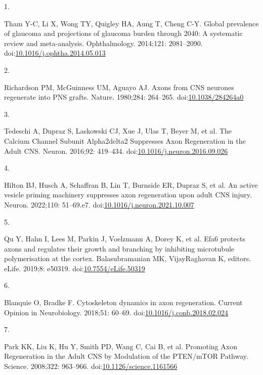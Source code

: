 \documentclass[
  12pt,
  a4paper,
]{book}
\newlength{\cslhangindent}
\newlength{\csllabelwidth}
\newlength{\cslentryspacingunit} %
\newenvironment{CSLReferences}[2] %
 {%
  \setlength{\parindent}{0pt}
  \ifodd #1
  \let\oldpar\par
  \def\par{\hangindent=\cslhangindent\oldpar}
  \fi
  \setlength{\parskip}{#2\cslentryspacingunit}
 }%
 {}
\newcommand{\CSLLeftMargin}[1]{\parbox[t]{\csllabelwidth}{#1}}
\newcommand{\CSLRightInline}[1]{\parbox[t]{\linewidth - \csllabelwidth}{#1}\break}
\begin{document}
\hypertarget{refs}{}
\begin{CSLReferences}{0}{0}
\leavevmode{}%
\CSLLeftMargin{1. }%
\CSLRightInline{Tham Y-C, Li X, Wong TY, Quigley HA, Aung T, Cheng C-Y. Global prevalence of glaucoma and projections of glaucoma burden through 2040: A systematic review and meta-analysis. Ophthalmology. 2014;121: 2081--2090. doi:\href{https://doi.org/10.1016/j.ophtha.2014.05.013}{10.1016/j.ophtha.2014.05.013}}

\leavevmode{}%
\CSLLeftMargin{2. }%
\CSLRightInline{Richardson PM, McGuinness UM, Aguayo AJ. Axons from {CNS} neurones regenerate into {PNS} grafts. Nature. 1980;284: 264--265. doi:\href{https://doi.org/10.1038/284264a0}{10.1038/284264a0}}

\leavevmode{}%
\CSLLeftMargin{3. }%
\CSLRightInline{Tedeschi A, Dupraz S, Laskowski CJ, Xue J, Ulas T, Beyer M, et al. The {Calcium Channel Subunit Alpha2delta2 Suppresses Axon Regeneration} in the {Adult CNS}. Neuron. 2016;92: 419--434. doi:\href{https://doi.org/10.1016/j.neuron.2016.09.026}{10.1016/j.neuron.2016.09.026}}

\leavevmode{}%
\CSLLeftMargin{4. }%
\CSLRightInline{Hilton BJ, Husch A, Schaffran B, Lin T, Burnside ER, Dupraz S, et al. An active vesicle priming machinery suppresses axon regeneration upon adult {CNS} injury. Neuron. 2022;110: 51--69.e7. doi:\href{https://doi.org/10.1016/j.neuron.2021.10.007}{10.1016/j.neuron.2021.10.007}}

\leavevmode{}%
\CSLLeftMargin{5. }%
\CSLRightInline{Qu Y, Hahn I, Lees M, Parkin J, Voelzmann A, Dorey K, et al. Efa6 protects axons and regulates their growth and branching by inhibiting microtubule polymerisation at the cortex. Balasubramanian MK, VijayRaghavan K, editors. eLife. 2019;8: e50319. doi:\href{https://doi.org/10.7554/eLife.50319}{10.7554/eLife.50319}}

\leavevmode{}%
\CSLLeftMargin{6. }%
\CSLRightInline{Blanquie O, Bradke F. Cytoskeleton dynamics in axon regeneration. Current Opinion in Neurobiology. 2018;51: 60--69. doi:\href{https://doi.org/10.1016/j.conb.2018.02.024}{10.1016/j.conb.2018.02.024}}

\leavevmode{}%
\CSLLeftMargin{7. }%
\CSLRightInline{Park KK, Liu K, Hu Y, Smith PD, Wang C, Cai B, et al. Promoting {Axon Regeneration} in the {Adult CNS} by {Modulation} of the {PTEN}/{mTOR Pathway}. Science. 2008;322: 963--966. doi:\href{https://doi.org/10.1126/science.1161566}{10.1126/science.1161566}}


\end{CSLReferences}
\end{document}
